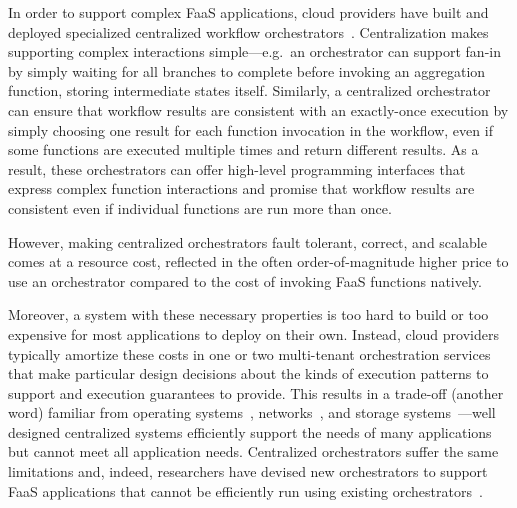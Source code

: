 In order to support complex FaaS applications, cloud providers have built and
deployed specialized centralized workflow
orchestrators~\cite{aws-step-functions, google-cloud-composer, google-workflows,
durable-functions}. Centralization makes supporting complex
interactions simple---e.g.\ an orchestrator can support fan-in by simply waiting
for all branches to complete before invoking an aggregation function, storing
intermediate states itself. Similarly, a centralized orchestrator can ensure
that workflow results are consistent with an exactly-once execution by simply
choosing one result for each function invocation in the workflow, even if some
functions are executed multiple times and return different results. As a result,
these orchestrators can offer high-level programming interfaces that express
complex function interactions and promise that workflow results are consistent
even if individual functions are run more than once.

However, making centralized orchestrators fault tolerant, correct, and scalable
comes at a resource cost, reflected in the often order-of-magnitude higher price
to use an orchestrator compared to the cost of invoking FaaS functions natively.

Moreover, a system with these necessary properties is too hard to build or too
expensive for most applications to deploy on their own. Instead, cloud providers
typically amortize these costs in one or two multi-tenant orchestration services
that make particular design decisions about the kinds of execution patterns to
support and execution guarantees to provide. This results in a trade-off
(another word) familiar from operating systems~\cite{exokernel,spin},
networks~\cite{active-networks,sdn}, and storage
systems~\cite{comet,rust-comet}---well designed centralized systems efficiently
support the needs of many applications but cannot meet all application needs.
Centralized orchestrators suffer the same limitations and, indeed, researchers
have devised new orchestrators to support FaaS applications that cannot be
efficiently run using existing orchestrators~\cite{excamera,gg-atc}.

